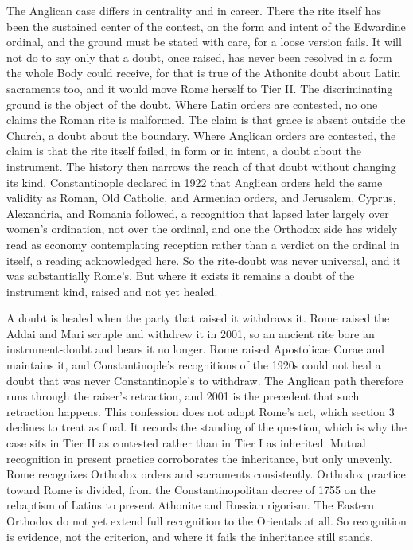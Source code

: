 \documentclass[11pt,twoside]{article}
\begin{document}
The Anglican case differs in centrality and in career. There the rite itself has been the sustained center of the contest, on the form and intent of the Edwardine ordinal, and the ground must be stated with care, for a loose version fails. It will not do to say only that a doubt, once raised, has never been resolved in a form the whole Body could receive, for that is true of the Athonite doubt about Latin sacraments too, and it would move Rome herself to Tier II. The discriminating ground is the object of the doubt. Where Latin orders are contested, no one claims the Roman rite is malformed. The claim is that grace is absent outside the Church, a doubt about the boundary. Where Anglican orders are contested, the claim is that the rite itself failed, in form or in intent, a doubt about the instrument. The history then narrows the reach of that doubt without changing its kind. Constantinople declared in 1922 that Anglican orders held the same validity as Roman, Old Catholic, and Armenian orders, and Jerusalem, Cyprus, Alexandria, and Romania followed, a recognition that lapsed later largely over women's ordination, not over the ordinal, and one the Orthodox side has widely read as economy contemplating reception rather than a verdict on the ordinal in itself, a reading acknowledged here. So the rite-doubt was never universal, and it was substantially Rome's. But where it exists it remains a doubt of the instrument kind, raised and not yet healed.

A doubt is healed when the party that raised it withdraws it. Rome raised the Addai and Mari scruple and withdrew it in 2001, so an ancient rite bore an instrument-doubt and bears it no longer. Rome raised Apostolicae Curae and maintains it, and Constantinople's recognitions of the 1920s could not heal a doubt that was never Constantinople's to withdraw. The Anglican path therefore runs through the raiser's retraction, and 2001 is the precedent that such retraction happens. This confession does not adopt Rome's act, which section 3 declines to treat as final. It records the standing of the question, which is why the case sits in Tier II as contested rather than in Tier I as inherited. Mutual recognition in present practice corroborates the inheritance, but only unevenly. Rome recognizes Orthodox orders and sacraments consistently. Orthodox practice toward Rome is divided, from the Constantinopolitan decree of 1755 on the rebaptism of Latins to present Athonite and Russian rigorism. The Eastern Orthodox do not yet extend full recognition to the Orientals at all. So recognition is evidence, not the criterion, and where it fails the inheritance still stands.
\end{document}
